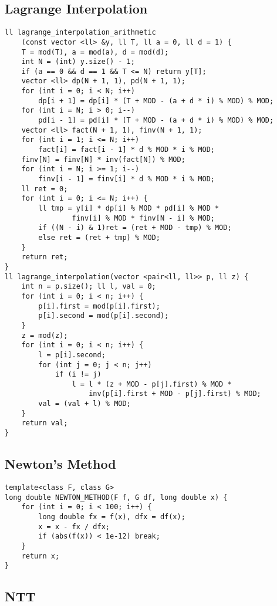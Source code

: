 \documentclass[landscape, 8pt, a4paper, oneside]{extarticle}
\begin{document}
\begin{multicols}{3}
\subsection{Lagrange Interpolation}
\begin{verbatim}
ll lagrange_interpolation_arithmetic
    (const vector <ll> &y, ll T, ll a = 0, ll d = 1) {
    T = mod(T), a = mod(a), d = mod(d);
    int N = (int) y.size() - 1;
    if (a == 0 && d == 1 && T <= N) return y[T];
    vector <ll> dp(N + 1, 1), pd(N + 1, 1);
    for (int i = 0; i < N; i++)
        dp[i + 1] = dp[i] * (T + MOD - (a + d * i) % MOD) % MOD;
    for (int i = N; i > 0; i--)
        pd[i - 1] = pd[i] * (T + MOD - (a + d * i) % MOD) % MOD;
    vector <ll> fact(N + 1, 1), finv(N + 1, 1);
    for (int i = 1; i <= N; i++)
        fact[i] = fact[i - 1] * d % MOD * i % MOD;
    finv[N] = finv[N] * inv(fact[N]) % MOD;
    for (int i = N; i >= 1; i--)
        finv[i - 1] = finv[i] * d % MOD * i % MOD;
    ll ret = 0;
    for (int i = 0; i <= N; i++) {
        ll tmp = y[i] * dp[i] % MOD * pd[i] % MOD *
                finv[i] % MOD * finv[N - i] % MOD;
        if ((N - i) & 1)ret = (ret + MOD - tmp) % MOD;
        else ret = (ret + tmp) % MOD;
    }
    return ret;
}
ll lagrange_interpolation(vector <pair<ll, ll>> p, ll z) {
    int n = p.size(); ll l, val = 0;
    for (int i = 0; i < n; i++) {
        p[i].first = mod(p[i].first);
        p[i].second = mod(p[i].second);
    }
    z = mod(z);
    for (int i = 0; i < n; i++) {
        l = p[i].second;
        for (int j = 0; j < n; j++)
            if (i != j)
                l = l * (z + MOD - p[j].first) % MOD *
                    inv(p[i].first + MOD - p[j].first) % MOD;
        val = (val + l) % MOD;
    }
    return val;
}
\end{verbatim}
\subsection{Newton's Method}
\begin{verbatim}
template<class F, class G>
long double NEWTON_METHOD(F f, G df, long double x) {
    for (int i = 0; i < 100; i++) {
        long double fx = f(x), dfx = df(x);
        x = x - fx / dfx;
        if (abs(f(x)) < 1e-12) break;
    }
    return x;
}
\end{verbatim}
\subsection{NTT}
\begin{verbatim}


\end{verbatim}
\end{multicols}
\end{document}
